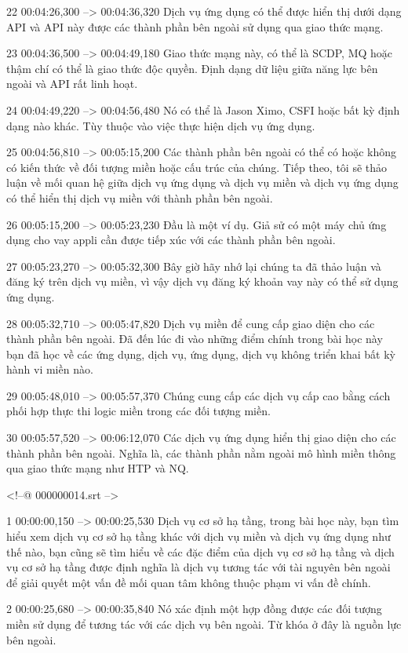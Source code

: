 22
00:04:26,300 --> 00:04:36,320
Dịch vụ ứng dụng có thể được hiển thị dưới dạng API và API này được các thành phần bên ngoài sử dụng qua giao thức mạng.

23
00:04:36,500 --> 00:04:49,180
Giao thức mạng này, có thể là SCDP, MQ hoặc thậm chí có thể là giao thức độc quyền.  Định dạng dữ liệu giữa năng lực bên ngoài và API rất linh hoạt.

24
00:04:49,220 --> 00:04:56,480
Nó có thể là Jason Ximo, CSFI hoặc bất kỳ định dạng nào khác.  Tùy thuộc vào việc thực hiện dịch vụ ứng dụng.

25
00:04:56,810 --> 00:05:15,200
Các thành phần bên ngoài có thể có hoặc không có kiến ​​thức về đối tượng miền hoặc cấu trúc của chúng.  Tiếp theo, tôi sẽ thảo luận về mối quan hệ giữa dịch vụ ứng dụng và dịch vụ miền và dịch vụ ứng dụng có thể hiển thị dịch vụ miền với thành phần bên ngoài.

26
00:05:15,200 --> 00:05:23,230
Đầu là một ví dụ.  Giả sử có một máy chủ ứng dụng cho vay appli cần được tiếp xúc với các thành phần bên ngoài.

27
00:05:23,270 --> 00:05:32,300
Bây giờ hãy nhớ lại chúng ta đã thảo luận và đăng ký trên dịch vụ miền, vì vậy dịch vụ đăng ký khoản vay này có thể sử dụng ứng dụng.

28
00:05:32,710 --> 00:05:47,820
Dịch vụ miền để cung cấp giao diện cho các thành phần bên ngoài.  Đã đến lúc đi vào những điểm chính trong bài học này bạn đã học về các ứng dụng, dịch vụ, ứng dụng, dịch vụ không triển khai bất kỳ hành vi miền nào.

29
00:05:48,010 --> 00:05:57,370
Chúng cung cấp các dịch vụ cấp cao bằng cách phối hợp thực thi logic miền trong các đối tượng miền.

30
00:05:57,520 --> 00:06:12,070
Các dịch vụ ứng dụng hiển thị giao diện cho các thành phần bên ngoài.  Nghĩa là, các thành phần nằm ngoài mô hình miền thông qua giao thức mạng như HTP và NQ.

<!--@ 000000014.srt -->

1
00:00:00,150 --> 00:00:25,530
Dịch vụ cơ sở hạ tầng, trong bài học này, bạn tìm hiểu xem dịch vụ cơ sở hạ tầng khác với dịch vụ miền và dịch vụ ứng dụng như thế nào, bạn cũng sẽ tìm hiểu về các đặc điểm của dịch vụ cơ sở hạ tầng và dịch vụ cơ sở hạ tầng được định nghĩa là dịch vụ tương tác với tài nguyên bên ngoài để giải quyết một vấn đề  mối quan tâm không thuộc phạm vi vấn đề chính.

2
00:00:25,680 --> 00:00:35,840
Nó xác định một hợp đồng được các đối tượng miền sử dụng để tương tác với các dịch vụ bên ngoài.  Từ khóa ở đây là nguồn lực bên ngoài.


